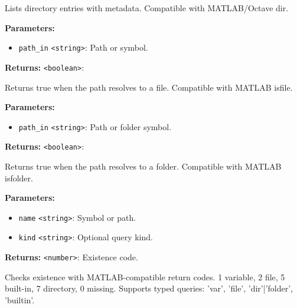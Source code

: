 \documentclass[12pt,a4paper]{article}
\begin{document}
\noindent Lists directory entries with metadata.
Compatible with MATLAB/Octave \textasciigrave{}dir\textasciigrave{}.

\vspace{5mm}
\noindent {}


\noindent \textbf{Parameters:}
\begin{itemize}
  \item \texttt{path\_in} \texttt{<string>}: Path or symbol.
\end{itemize}

\noindent \textbf{Returns:} \texttt{<boolean>}:

\noindent Returns true when the path resolves to a file.
Compatible with MATLAB \textasciigrave{}isfile\textasciigrave{}.

\vspace{5mm}
\noindent {}


\noindent \textbf{Parameters:}
\begin{itemize}
  \item \texttt{path\_in} \texttt{<string>}: Path or folder symbol.
\end{itemize}

\noindent \textbf{Returns:} \texttt{<boolean>}:

\noindent Returns true when the path resolves to a folder.
Compatible with MATLAB \textasciigrave{}isfolder\textasciigrave{}.

\vspace{5mm}
\noindent {}


\noindent \textbf{Parameters:}
\begin{itemize}
  \item \texttt{name} \texttt{<string>}: Symbol or path.
  \item \texttt{kind} \texttt{<string>}: Optional query kind.
\end{itemize}

\noindent \textbf{Returns:} \texttt{<number>}: Existence code.

\noindent Checks existence with MATLAB-compatible return codes.
\textasciigrave{}1\textasciigrave{} variable, \textasciigrave{}2\textasciigrave{} file, \textasciigrave{}5\textasciigrave{} built-in, \textasciigrave{}7\textasciigrave{} directory, \textasciigrave{}0\textasciigrave{} missing.
Supports typed queries: \textasciigrave{}'var'\textasciigrave{}, \textasciigrave{}'file'\textasciigrave{}, \textasciigrave{}'dir'|'folder'\textasciigrave{}, \textasciigrave{}'builtin'\textasciigrave{}.
\end{document}
